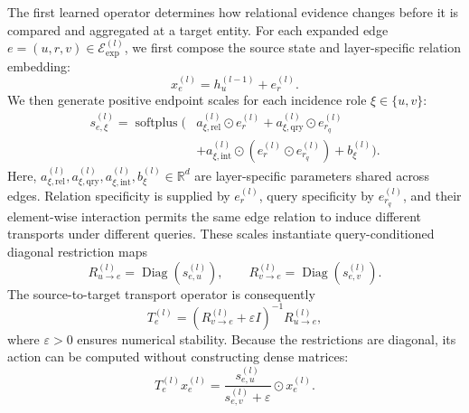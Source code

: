 \documentclass[a4paper,fleqn]{cas-sc}
\begin{document}
The first learned operator determines how relational evidence changes before it
is compared and aggregated at a target entity. For each expanded edge
$e=(u,r,v)\in\mathcal{E}_{\mathrm{exp}}^{(l)}$, we first compose the source
state and layer-specific relation embedding:
\begin{equation}
x_e^{(l)}=h_u^{(l-1)}+e_r^{(l)}.
\end{equation}
We then generate positive endpoint scales for each incidence role
$\xi\in\{u,v\}$:
\begin{equation}
\begin{aligned}
s_{e,\xi}^{(l)}
=\operatorname{softplus}\bigl(&
a_{\xi,\mathrm{rel}}^{(l)}\odot e_r^{(l)}
+a_{\xi,\mathrm{qry}}^{(l)}\odot e_{r_q}^{(l)}\\
&+a_{\xi,\mathrm{int}}^{(l)}\odot
\left(e_r^{(l)}\odot e_{r_q}^{(l)}\right)
+b_{\xi}^{(l)}\bigr).
\end{aligned}
\label{eq:sheaf_scales}
\end{equation}
Here,
$a_{\xi,\mathrm{rel}}^{(l)},a_{\xi,\mathrm{qry}}^{(l)},
a_{\xi,\mathrm{int}}^{(l)},b_{\xi}^{(l)}\in\mathbb{R}^{d}$ are
layer-specific parameters shared across edges. Relation specificity is supplied
by $e_r^{(l)}$, query specificity by $e_{r_q}^{(l)}$, and their element-wise
interaction permits the same edge relation to induce different transports under
different queries.
These scales instantiate query-conditioned diagonal restriction maps
\begin{equation}
R_{u\rightarrow e}^{(l)}=\operatorname{Diag}(s_{e,u}^{(l)}),
\qquad
R_{v\rightarrow e}^{(l)}=\operatorname{Diag}(s_{e,v}^{(l)}).
\label{eq:restriction_maps}
\end{equation}
The source-to-target transport operator is consequently
\begin{equation}
T_e^{(l)}
=
\left(R_{v\rightarrow e}^{(l)}+\varepsilon I\right)^{-1}
R_{u\rightarrow e}^{(l)},
\label{eq:sheaf_transport}
\end{equation}
where $\varepsilon>0$ ensures numerical stability. Because the restrictions are
diagonal, its action can be computed without constructing dense matrices:
\begin{equation}
T_e^{(l)}x_e^{(l)}
=
\frac{s_{e,u}^{(l)}}{s_{e,v}^{(l)}+\varepsilon}
\odot x_e^{(l)}.
\end{equation}
\end{document}
